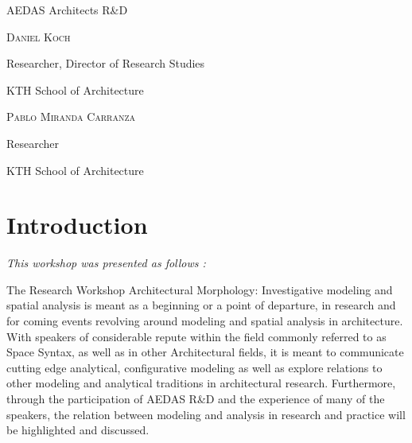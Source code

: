 \documentclass[english]{article}
\newcommand{\noun}[1]{\textsc{#1}}
\begin{document}
\textit{\large \hfill{}}AEDAS Architects R\&D\textit{\large \hfill{}\hfill{}}{\large \par}

\bigskip{}


\textit{\large \hfill{}}\noun{Daniel Koch}\textit{\large \hfill{}\hfill{}}{\large \par}

\textit{\large \hfill{}}Researcher, Director of Research Studies\textit{\large \hfill{}\hfill{}}{\large \par}

\textit{\large \hfill{}}KTH School of Architecture\textit{\large \hfill{}\hfill{}}{\large \par}

\bigskip{}


\textit{\large \hfill{}}\noun{Pablo Miranda Carranza}\textit{\large \hfill{}\hfill{}}{\large \par}

\textit{\large \hfill{}}Researcher\textit{\large \hfill{}\hfill{}}{\large \par}

\textit{\large \hfill{}}KTH School of Architecture\textit{\large \hfill{}\hfill{}}{\large \par}

\newpage{}


\section*{Introduction\bigskip{}
\bigskip{}
}

\textit{This workshop was presented as follows :}

\bigskip{}


\bigskip{}


The Research Workshop Architectural Morphology: Investigative modeling
and spatial analysis is meant as a beginning or a point of departure,
in research and for coming events revolving around modeling and spatial
analysis in architecture. With speakers of considerable repute within
the field commonly referred to as Space Syntax, as well as in other
Architectural fields, it is meant to communicate cutting edge analytical,
configurative modeling as well as explore relations to other modeling
and analytical traditions in architectural research. Furthermore,
through the participation of AEDAS R\&D and the experience of many
of the speakers, the relation between modeling and analysis in research
and practice will be highlighted and discussed.
\end{document}
